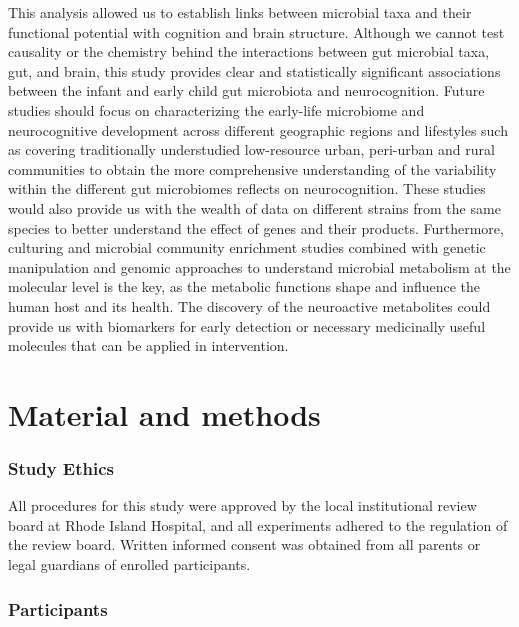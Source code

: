 \documentclass[a4paper]{article}
\begin{document}
This analysis allowed us to establish links between microbial taxa and
their functional potential with cognition and brain structure. Although
we cannot test causality or the chemistry behind the interactions
between gut microbial taxa, gut, and brain, this study provides clear
and statistically significant associations between the infant and early
child gut microbiota and neurocognition. Future studies should focus on
characterizing the early-life microbiome and neurocognitive development
across different geographic regions and lifestyles such as covering
traditionally understudied low-resource urban, peri-urban and rural
communities to obtain the more comprehensive understanding of the
variability within the different gut microbiomes reflects on
neurocognition. These studies would also provide us with the wealth of
data on different strains from the same species to better understand the
effect of genes and their products. Furthermore, culturing and microbial
community enrichment studies combined with genetic manipulation and
genomic approaches to understand microbial metabolism at the molecular
level is the key, as the metabolic functions shape and influence the
human host and its health. The discovery of the neuroactive metabolites
could provide us with biomarkers for early detection or necessary
medicinally useful molecules that can be applied in intervention.

\section*{Material and methods}

\subsubsection{Study Ethics}

All procedures for this study were approved by the local institutional
review board at Rhode Island Hospital, and all experiments adhered to
the regulation of the review board. Written informed consent was
obtained from all parents or legal guardians of enrolled participants.

\subsubsection{Participants}
\end{document}
